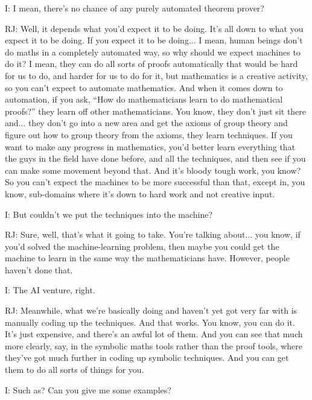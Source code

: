 \documentclass[10pt,titlepage]{book}
\begin{document}
I: I mean, there's no chance of any purely automated theorem prover?

RJ: Well, it depends what you'd expect it to be doing. It's all down to what you expect it to be doing. If you expect it to be doing... I mean, human beings don't do maths in a completely automated way, so why should we expect machines to do it? I mean, they can do all sorts of proofs automatically that would be hard for us to do, and harder for us to do for	it, but mathematics is a creative activity, so you can't expect to automate mathematics. And when it comes down to automation, if you ask, ``How do mathematicians learn to do mathematical proofs?'' they learn off other mathematicians. You know, they don't just sit there and... they don't go into a new area and get the axioms of group theory and figure out how to group theory from the axioms, they learn techniques. If you want to make any progress in mathematics, you'd better learn everything that the guys in the field have done before, and all the techniques, and then see if you can make some movement beyond that. And it's bloody tough work, you know? So you can't expect the machines to be more successful than that, except in, you know, sub-domains where it's down to hard work and not creative input.

I: But couldn't we put the techniques into the machine?

RJ: Sure, well, that's what it going to take.
You're talking about... you know, if you'd solved the machine-learning problem, then maybe you could get the machine to learn in the same way the mathematicians have. However, people haven't done that.

I: The AI venture, right.

RJ: Meanwhile, what we're basically doing and haven't yet got very far with is manually coding up the techniques.
And that works.
You know, you can do it.
It's just expensive, and there's an awful lot of them.
And you can see that much more clearly, say, in the symbolic maths tools rather than the proof tools, where they've got much further in coding up symbolic techniques.
And you can get them to do all sorts of things for you.

I: Such as?
Can you give me some examples?
\end{document}
